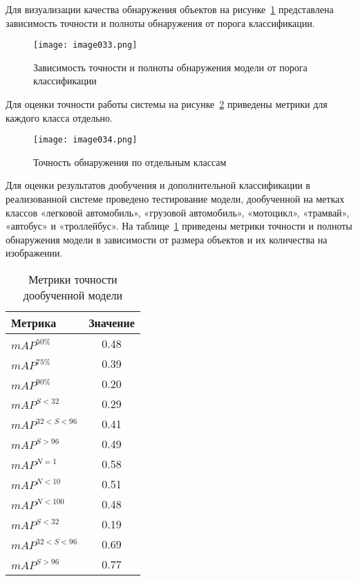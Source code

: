 Для визуализации качества обнаружения объектов на рисунке~\ref{fig:image033} представлена зависимость точности и полноты обнаружения от порога классификации.

\begin{figure}[htbp]
\centering
\texttt{[image: image033.png]}
\caption{Зависимость точности и полноты обнаружения модели от порога классификации}%
\label{fig:image033}
\end{figure}

Для оценки точности работы системы на рисунке~\ref{fig:image034} приведены метрики для каждого класса отдельно.

\begin{figure}[htbp]
\centering
\texttt{[image: image034.png]}
\caption{Точность обнаружения по отдельным классам}%
\label{fig:image034}
\end{figure}

Для оценки результатов дообучения и дополнительной классификации в реализованной системе проведено тестирование модели, дообученной на метках классов «легковой автомобиль», «грузовой автомобиль», «мотоцикл», «трамвай», «автобус» и «троллейбус». На таблице~\ref{tabular:tab_exp_3} приведены метрики точности и полноты обнаружения модели в зависимости от размера объектов и их количества на изображении.

\begin{table}[H]
	\def\arraystretch{1.3}
	\caption{Метрики точности дообученной модели}
	\begin{center}
		\begin{tabular}{|l|c|}
			\hline
			Метрика & Значение\\  \hline			
			\(mAP^{50\%}\) & 0.48\\ \hline			
			\(mAP^{75\%}\) & 0.39\\ \hline
			\(mAP^{90\%}\) & 0.20\\ \hline
			\(mAP^{S<32}\) & 0.29\\ \hline
			\(mAP^{32<S<96}\) & 0.41\\ \hline
			\(mAP^{S>96}\) & 0.49\\ \hline
			\(mAP^{N=1}\) & 0.58\\ \hline
			\(mAP^{N<10}\) & 0.51\\ \hline
			\(mAP^{N<100}\) & 0.48\\ \hline
			\(mAP^{S<32}\) & 0.19\\ \hline
			\(mAP^{32<S<96}\) & 0.69\\ \hline
			\(mAP^{S>96}\) & 0.77\\ \hline			
		\end{tabular}
		\label{tabular:tab_exp_3}
	\end{center}
\end{table}

